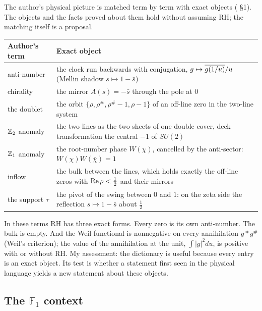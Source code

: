The author's physical picture is matched term by term with exact objects ( §1). The objects and the facts proved about them hold without assuming RH; the matching itself is a proposal.
\begin{center}\small
\begin{tabularx}{\linewidth}{@{}l X@{}}
\toprule
Author's term & Exact object\\
\midrule
anti-number & the clock run backwards with conjugation, $g\mapsto\overline{g(1/u)}/u$ (Mellin shadow $s\mapsto1-\bar s$)\\
chirality & the mirror $A(s)=-\bar s$ through the pole at $0$\\
the doublet & the orbit $\{\rho,\rho^\#,\rho^\#-1,\rho-1\}$ of an off-line zero in the two-line system\\
$\mathbb{Z}_2$ anomaly & the two lines as the two sheets of one double cover, deck transformation the central $-1$ of $SU(2)$\\
$\mathbb{Z}_1$ anomaly & the root-number phase $W(\chi)$, cancelled by the anti-sector: $W(\chi)W(\bar\chi)=1$\\
inflow & the bulk between the lines, which holds exactly the off-line zeros with $\operatorname{Re}\rho<\tfrac12$ and their mirrors\\
the support $\tau$ & the pivot of the swing between $0$ and $1$: on the zeta side the reflection $s\mapsto1-\bar s$ about $\tfrac12$\\
\bottomrule
\end{tabularx}
\end{center}
In these terms RH has three exact forms. Every zero is its own anti-number. The bulk is empty. And the Weil functional is nonnegative on every annihilation $g*g^\#$ (Weil's criterion); the value of the annihilation at the unit, $\int|g|^2du$, is positive with or without RH.
My assessment: the dictionary is useful because every entry is an exact object. Its test is whether a statement first seen in the physical language yields a new statement about these objects.

\subsection{The \texorpdfstring{$\mathbb{F}_1$}{F1} context}

